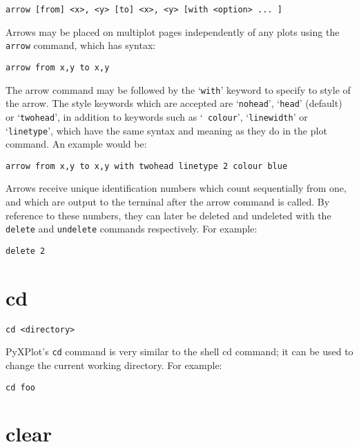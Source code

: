 \documentclass[a4paper,onecolumn,11pt]{book}
\begin{document}
\begin{verbatim}
arrow [from] <x>, <y> [to] <x>, <y> [with <option> ... ]
\end{verbatim}

Arrows may be placed on multiplot pages independently of any plots using the
{\tt arrow} command, which has syntax:

\begin{verbatim}
arrow from x,y to x,y
\end{verbatim}

The arrow command may be followed by the `{\tt with}' keyword to specify to
style of the arrow. The style keywords which are accepted are `{\tt nohead}',
`{\tt head}' (default) or `{\tt twohead}', in addition to keywords such as `{\tt
colour}', `{\tt linewidth}' or `{\tt linetype}', which have the same syntax and
meaning as they do in the plot command. An example would be:

\begin{verbatim}
arrow from x,y to x,y with twohead linetype 2 colour blue
\end{verbatim}

Arrows receive unique identification numbers which count sequentially from one,
and which are output to the terminal after the arrow command is called. By
reference to these numbers, they can later be deleted and undeleted with the
{\tt delete} and {\tt undelete} commands respectively. For example:

\begin{verbatim}
delete 2
\end{verbatim}

\section{cd}

\begin{verbatim}
cd <directory>
\end{verbatim}

PyXPlot's {\tt cd} command is very similar to the shell cd command; it can be used to
change the current working directory. For example:

\begin{verbatim}
cd foo
\end{verbatim}


\section{clear}
\end{document}
